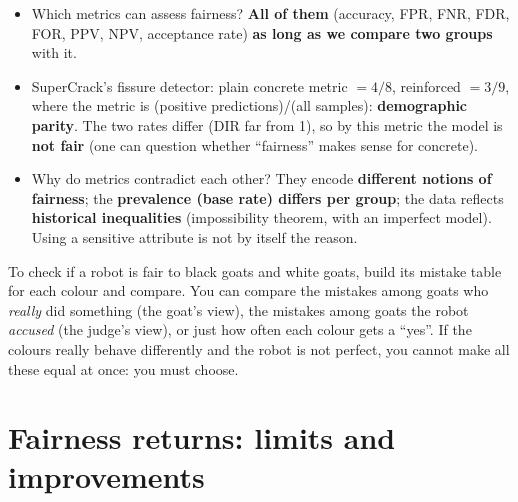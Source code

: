 \documentclass[11pt,a4paper,openany]{book}
\begin{document}
\begin{exbox}[title={Exam-type questions}]
\begin{itemize}
  \item Which metrics can assess fairness? \textbf{All of them} (accuracy, FPR, FNR, FDR, FOR,
        PPV, NPV, acceptance rate) \textbf{as long as we compare two groups} with it.
  \item SuperCrack's fissure detector: plain concrete metric $=4/8$, reinforced $=3/9$, where
        the metric is (positive predictions)/(all samples): \textbf{demographic parity}. The two
        rates differ (DIR far from 1), so by this metric the model is \textbf{not fair} (one can
        question whether ``fairness'' makes sense for concrete).
  \item Why do metrics contradict each other? They encode \textbf{different notions of
        fairness}; the \textbf{prevalence (base rate) differs per group}; the data reflects
        \textbf{historical inequalities} (impossibility theorem, with an imperfect model). Using
        a sensitive attribute is not by itself the reason.
\end{itemize}
\end{exbox}

\begin{goatbox}
To check if a robot is fair to black goats and white goats, build its mistake table for each
colour and compare. You can compare the mistakes among goats who \emph{really} did something
(the goat's view), the mistakes among goats the robot \emph{accused} (the judge's view), or just
how often each colour gets a ``yes''. If the colours really behave differently and the robot is
not perfect, you cannot make all these equal at once: you must choose.
\end{goatbox}


\section{Fairness returns: limits and improvements}
\end{document}
